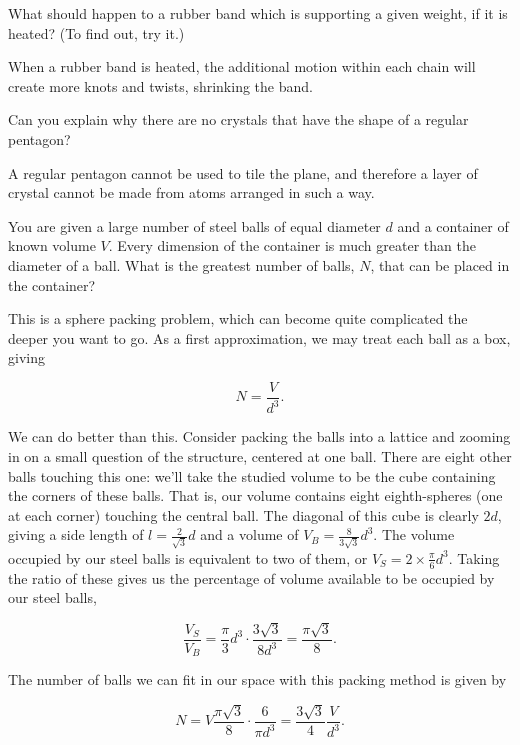 \documentclass[../feynman-lectures-on-physics.tex]{subfiles}
\begin{document}
\begin{questions}
\question What should happen to a rubber band which is supporting a given weight, if it is heated? (To find out, try it.)

\begin{solution}
	When a rubber band is heated, the additional motion within each chain will create more knots and twists, shrinking the band.
\end{solution}

\question Can you explain why there are no crystals that have the shape of a regular pentagon?

\begin{solution}
	A regular pentagon cannot be used to tile the plane, and therefore a layer of crystal cannot be made from atoms arranged in such a way.
\end{solution}

\question You are given a large number of steel balls of equal diameter $d$ and a container of known volume $V$. Every dimension of the container is much greater than the diameter of a ball. What is the greatest number of balls, $N$, that can be placed in the container?

\begin{solution}
	This is a sphere packing problem, which can become quite complicated the deeper you want to go. As a first approximation, we may treat each ball as a box, giving

	\[
	N = \frac{V}{d^3}
	.\] 
	
	We can do better than this. Consider packing the balls into a lattice and zooming in on a small question of the structure, centered at one ball. There are eight other balls touching this one: we'll take the studied volume to be the cube containing the corners of these balls. That is, our volume contains eight eighth-spheres (one at each corner) touching the central ball. The diagonal of this cube is clearly $2d$, giving a side length of $l = \frac{2}{\sqrt{3}}d$ and a volume of $V_B = \frac{8}{3\sqrt{3}}d^3$. The volume occupied by our steel balls is equivalent to two of them, or $V_S = 2\times\frac{\pi}{6}d^3$. Taking the ratio of these gives us the percentage of volume available to be occupied by our steel balls,

	\[
	\frac{V_S}{V_B} = \frac{\pi}{3}d^3\cdot\frac{3\sqrt{3}}{8d^3} = \frac{\pi\sqrt{3}}{8}
	.\] 

	The number of balls we can fit in our space with this packing method is given by

	\[
	N = V\frac{\pi\sqrt{3}}{8}\cdot\frac{6}{\pi{d^3}} = \frac{3\sqrt{3}}{4}\frac{V}{d^3}
	.\] 


\end{solution}
\end{questions}
\end{document}
